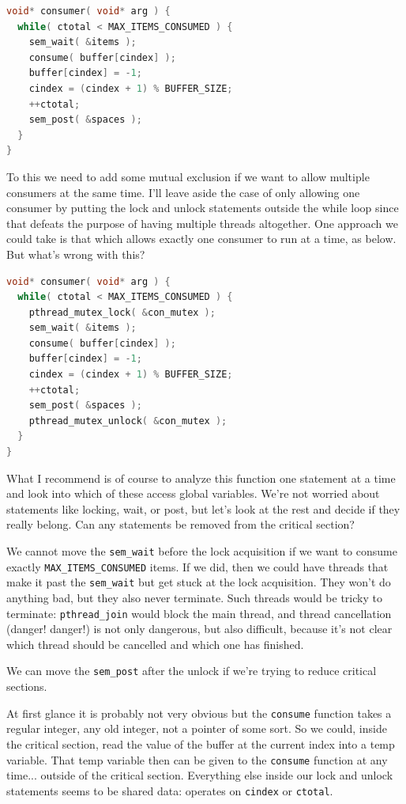 \documentclass[a4paper]{report}
\begin{document}
\begin{lstlisting}[language=C]
void* consumer( void* arg ) { 
  while( ctotal < MAX_ITEMS_CONSUMED ) {
    sem_wait( &items );
    consume( buffer[cindex] );
    buffer[cindex] = -1;
    cindex = (cindex + 1) % BUFFER_SIZE;
    ++ctotal;
    sem_post( &spaces );
  }
}
\end{lstlisting}

To this we need to add some mutual exclusion if we want to allow multiple consumers at the same time. I'll leave aside the case of only allowing one consumer by putting the lock and unlock statements outside the while loop since that defeats the purpose of having multiple threads altogether. One approach we could take is that which allows exactly one consumer to run at a time, as below. But what's wrong with this?

\begin{lstlisting}[language=C]
void* consumer( void* arg ) { 
  while( ctotal < MAX_ITEMS_CONSUMED ) {
    pthread_mutex_lock( &con_mutex );
    sem_wait( &items );
    consume( buffer[cindex] );
    buffer[cindex] = -1;
    cindex = (cindex + 1) % BUFFER_SIZE;
    ++ctotal;
    sem_post( &spaces );
    pthread_mutex_unlock( &con_mutex );
  }
}
\end{lstlisting}

What I recommend is of course to analyze this function one statement at a time and look into which of these access global variables. We're not worried about statements like locking, wait, or post, but let's look at the rest and decide if they really belong. Can any statements be removed from the critical section?

We cannot move the {\tt sem\_wait} before the lock acquisition if we want to consume exactly {\tt MAX\_ITEMS\_CONSUMED} items. If we did, then we could have threads that make it past the {\tt sem\_wait} but get stuck at the lock acquisition. They won't do anything bad, but they also never terminate. Such threads would be tricky to terminate: {\tt pthread\_join} would block the main thread, and thread cancellation (danger! danger!) is not only dangerous, but also difficult, because it's not clear which thread should be cancelled and which one has finished.

We can move the {\tt sem\_post} after the unlock if we're trying to reduce critical sections.

At first glance it is probably not very obvious but the \texttt{consume} function takes a regular integer, any old integer, not a pointer of some sort. So we could, inside the critical section, read the value of the buffer at the current index into a temp variable. That temp variable then can be given to the \texttt{consume} function at any time... outside of the critical section. Everything else inside our lock and unlock statements seems to be shared data: operates on \texttt{cindex} or \texttt{ctotal}.
\end{document}
